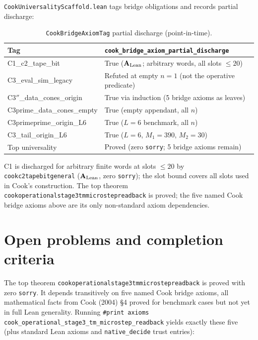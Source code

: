 \documentclass[11pt]{article}
\theoremstyle{remark}
\newcommand{\CatAL}{\ensuremath{\textbf{A}_{\rm Lean}}}
\newcommand{\lean}[1]{%
  \penalty-100
  \begingroup\def\_{\textunderscore\allowbreak}\texttt{#1}\endgroup}
\begin{document}
\texttt{CookUniversalityScaffold.lean} tags bridge obligations and records partial discharge:

\begin{table}[H]
\centering
\caption{\texttt{CookBridgeAxiomTag} partial discharge (point-in-time).}
\label{tab:partial}
\small
\begin{tabular}{@{}ll@{}}
\toprule
\textbf{Tag} & \textbf{\texttt{cook\_bridge\_axiom\_partial\_discharge}} \\
\midrule
C1\_c2\_tape\_bit & True ($\CatAL$; arbitrary words, all slots $\le 20$) \\
C3\_eval\_sim\_legacy & Refuted at empty $n{=}1$ (not the operative predicate) \\
C3$''$\_data\_cones\_origin & True via induction (5 bridge axioms as leaves) \\
C3prime\_data\_cones\_empty & True (empty appendant, all $n$) \\
C3primeprime\_origin\_L6 & True ($L{=}6$ benchmark, all $n$) \\
C3\_tail\_origin\_L6 & True ($L{=}6$, $M_1{=}390$, $M_2{=}30$) \\
Top universality & Proved (zero \texttt{sorry}; 5 bridge axioms remain) \\
\bottomrule
\end{tabular}
\end{table}

C1 is discharged for arbitrary finite words at slots $\le 20$ by
\lean{cook\_c2\_tape\_bit\_general} ($\CatAL$, zero \texttt{sorry});
the slot bound covers all slots used in Cook's construction.
The top theorem \lean{cook\_operational\_stage3\_tm\_microstep\_readback} is proved; the five named Cook
bridge axioms above are its only non-standard axiom dependencies.

\section{Open problems and completion criteria}
\label{sec:open}

The top theorem \lean{cook\_operational\_stage3\_tm\_microstep\_readback} is proved with zero \texttt{sorry}.
It depends transitively on five named Cook bridge axioms, all mathematical facts from
Cook (2004) \S4 proved for benchmark cases but not yet in full Lean generality.
Running \texttt{\#print axioms cook\_operational\_stage3\_tm\_microstep\_readback} yields exactly these five
(plus standard Lean axioms and \texttt{native\_decide} trust entries):
\end{document}
